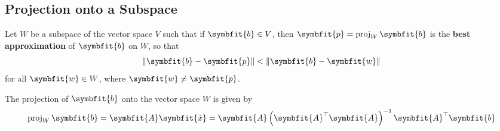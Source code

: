 \documentclass{article}
\begin{document}
\subsection{Projection onto a Subspace}
\begin{theorem}
    Let \(W\) be a subspace of the vector space \(V\) such that if
    \(\symbfit{b}\in V\), then \(\symbfit{p}=\proj_{W}\symbfit{b}\) is
    the \textbf{best approximation} of \(\symbfit{b}\) on \(W\), so that
    \begin{equation*}
        \norm{\symbfit{b}-\symbfit{p}}<\norm{\symbfit{b}-\symbfit{w}}
    \end{equation*}
    for all \(\symbfit{w}\in W\), where \(\symbfit{w}\neq \symbfit{p}\).
\end{theorem}
\begin{theorem}
    The projection of \(\symbfit{b}\) onto the vector space \(W\) is
    given by
    \begin{equation*}
        \proj_{W}\symbfit{b} = \symbfit{A}\symbfit{\hat{x}} = \symbfit{A}\left( \symbfit{A}^\top \symbfit{A} \right)^{-1}\symbfit{A}^\top \symbfit{b}
    \end{equation*}
\end{theorem}
\end{document}
